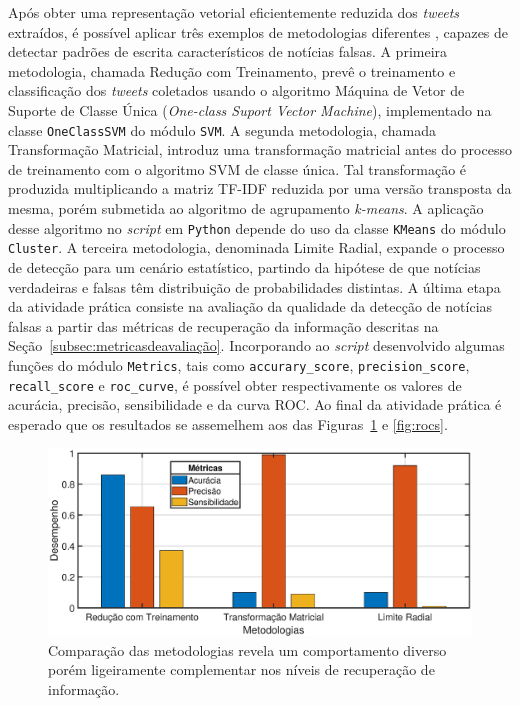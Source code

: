 \documentclass{SBCbookchapter}
\begin{document}
Após obter uma representação vetorial eficientemente reduzida dos \textit{tweets} extraídos, é possível aplicar três exemplos de metodologias diferentes \cite{nicollasspl2020}, capazes de detectar padrões de escrita característicos de notícias falsas. A primeira metodologia, chamada Redução com Treinamento, prevê o treinamento e classificação dos \textit{tweets} coletados usando o algoritmo Máquina de Vetor de Suporte de Classe Única (\textit{One-class Suport Vector Machine}), implementado na classe \texttt{OneClassSVM} do módulo \texttt{SVM}. A segunda metodologia, chamada Transformação Matricial, introduz uma transformação matricial antes do processo de treinamento com o algoritmo SVM de classe única. Tal transformação é produzida multiplicando a matriz TF-IDF reduzida por uma versão transposta da mesma, porém submetida ao algoritmo de agrupamento \textit{k-means}. A aplicação desse algoritmo no \textit{script} em \texttt{Python} depende do uso da classe \texttt{KMeans} do módulo \texttt{Cluster}. A terceira metodologia, denominada Limite Radial, expande o processo de detecção para um cenário estatístico, partindo da hipótese de que notícias verdadeiras e falsas têm distribuição de probabilidades distintas. A última etapa da atividade prática consiste na avaliação da qualidade da detecção de notícias falsas a partir das métricas de recuperação da informação descritas na Seção~\ref{subsec:metricasdeavaliação}. Incorporando ao \textit{script} desenvolvido algumas funções do módulo \texttt{Metrics}, tais como \texttt{accurary\_score}, \texttt{precision\_score}, \texttt{recall\_score} e \texttt{roc\_curve}, é possível obter respectivamente os valores de acurácia, precisão, sensibilidade e da curva ROC. Ao final da atividade prática é esperado que os resultados se assemelhem aos das Figuras~\ref{fig:metodologias} e \ref{fig:rocs}.

\begin{figure}[b!]
	\centering
		\includegraphics[width=.9\textwidth]{metodologia_fake.eps}
		\caption{Comparação das metodologias revela um comportamento diverso porém ligeiramente complementar nos níveis de recuperação de informação.}
		\label{fig:metodologias}
\end{figure}
\end{document}

